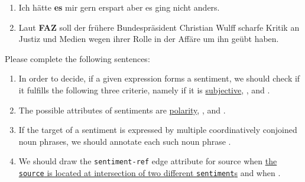\documentclass[12pt,fleqn]{scrreprt}
\begin{document}
\begin{enumerate}[I)]
\begin{enumerate}
  \item Ich h\"atte \textbf{es} mir gern erspart aber es ging nicht anders.

  \item Laut \textbf{FAZ} soll der fr\"uhere Bundespr\"asident Christian Wulff
    scharfe Kritik an Justiz und Medien wegen ihrer Rolle in der Aff\"are
    um ihn ge\"ubt haben.
  \end{enumerate}

  {\bfseries\item Please complete the following sentences:}
  \begin{enumerate}
  \item In order to decide, if a given expression forms a sentiment,
    we should check if it fulfills the following three criterie,
    namely if it is \underline{subjective}, \underline{\hspace{4cm}},
    and \underline{\hspace{4cm}}.

  \item The possible attributes of sentiments are
    \underline{polarity}, \underline{\hspace{4cm}}, and
    \underline{\hspace{4cm}}.

  \item If the target of a sentiment is expressed by multiple
    coordinatively conjoined noun phrases, we should annotate each
    such noun phrase \underline{\hspace{4cm}}.

  \item We should draw the \texttt{sentiment-ref} edge attribute for
    source when \underline{the \texttt{source} is located at
      intersection of two different \texttt{sentiment}s} and when
    \underline{\hspace{8cm}}.


\end{enumerate}
\end{enumerate}
\end{document}
